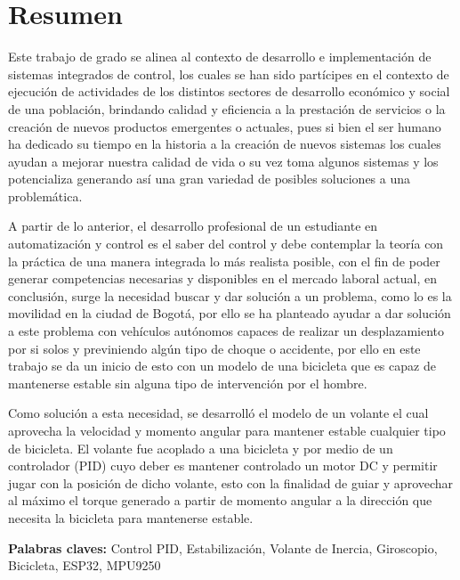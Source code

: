 \documentclass[12pt,letterpaper]{report}
\begin{document}
\newpage
\chapter*{Resumen}

Este trabajo de grado se alinea al contexto de desarrollo e implementación de sistemas integrados de control, los cuales se han sido partícipes en el contexto de ejecución de actividades de los distintos sectores de desarrollo económico y social de una población, brindando calidad y eficiencia a la prestación de servicios o la creación de nuevos productos emergentes o actuales, pues si bien el ser humano ha dedicado su tiempo en la historia a la creación de nuevos sistemas los cuales ayudan a mejorar nuestra calidad de vida o su vez toma algunos sistemas y los potencializa generando así una gran variedad de posibles soluciones a una problemática.

A partir de lo anterior, el desarrollo profesional de un estudiante en automatización y control es el saber del control y debe contemplar la teoría con la práctica de una manera integrada lo más realista posible, con el fin de poder generar competencias necesarias y disponibles en el mercado laboral actual, en conclusión, surge la necesidad buscar y dar solución a un problema, como lo es la movilidad en la ciudad de Bogotá, por ello se ha planteado ayudar a dar solución a este problema con vehículos autónomos capaces de realizar un desplazamiento por si solos y previniendo algún tipo de choque o accidente, por ello en este trabajo se da un inicio de esto con un modelo de una bicicleta que es capaz de mantenerse estable sin alguna tipo de intervención por el hombre.

Como solución a esta necesidad, se desarrolló el modelo de un volante el cual aprovecha la velocidad y momento angular para mantener estable cualquier tipo de bicicleta. El volante fue acoplado a una bicicleta y por medio de un controlador (PID) cuyo deber es mantener controlado un motor DC y permitir jugar con la posición de dicho volante, esto con la finalidad de guiar y aprovechar al máximo el torque generado a partir de momento angular a la dirección que necesita la bicicleta para mantenerse estable.

\noindent\textbf{Palabras claves:} Control PID, Estabilización, Volante de Inercia, Giroscopio, Bicicleta, ESP32, MPU9250
\end{document}
